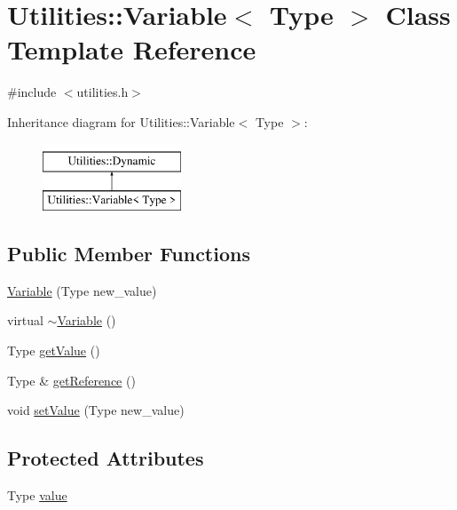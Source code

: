 \hypertarget{classUtilities_1_1Variable}{}\section{Utilities\+:\+:Variable$<$ Type $>$ Class Template Reference}
\label{classUtilities_1_1Variable}


{\ttfamily \#include $<$utilities.\+h$>$}

Inheritance diagram for Utilities\+:\+:Variable$<$ Type $>$\+:\begin{figure}[H]
\begin{center}
\leavevmode
\includegraphics[height=2.000000cm]{classUtilities_1_1Variable}
\end{center}
\end{figure}
\subsection*{Public Member Functions}
\begin{DoxyCompactItemize}
\item 
\hyperlink{classUtilities_1_1Variable_af6f55d5d5c2472b25212828c66b730bc}{Variable} (Type new\+\_\+value)
\item 
virtual \hyperlink{classUtilities_1_1Variable_a4d2bce0bd082e8464b9f193d1e908e0a}{$\sim$\+Variable} ()
\item 
Type \hyperlink{classUtilities_1_1Variable_a2531a59e087062fab302cf487b6bdfa2}{get\+Value} ()
\item 
Type \& \hyperlink{classUtilities_1_1Variable_aec9b6becdc76afca1635280ab81ac41d}{get\+Reference} ()
\item 
void \hyperlink{classUtilities_1_1Variable_af218f1c4f50cbb2f69cc66e8150e05b3}{set\+Value} (Type new\+\_\+value)
\end{DoxyCompactItemize}
\subsection*{Protected Attributes}
\begin{DoxyCompactItemize}
\item 
Type \hyperlink{classUtilities_1_1Variable_ab91417296eea0614f336941a2ecc2944}{value}
\end{DoxyCompactItemize}


